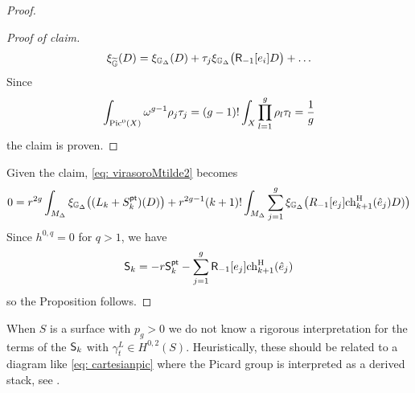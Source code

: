 \documentclass[a4paper, 12pt]{amsart}
\begin{document}
\begin{proof}
\begin{proof}[Proof of claim]
\begin{align*}
\xi_{\widetilde {{\mathbb{G}}}}(D)=\xi_{{\mathbb{G}}_\Delta}(D)+\tau_j\xi_{{\mathbb{G}}_\Delta}\big(\mathsf{R}_{-1}[e_i]D\big)+\ldots
\end{align*}
Since 
\[\int_{\mathop{\rm Pic}\nolimits^0(X)}\omega^{g-1}\rho_j\tau_j=(g-1)!\int_X \prod_{l=1}^g \rho_l\tau_l=\frac{1}{g}\]
the claim is proven.\qedhere
\end{proof}
Given the claim, \eqref{eq: virasoroMtilde2} becomes
\[
0=r^{2g}\int_{M_\Delta}\xi_{{\mathbb{G}}_\Delta}\big((L_k+S_k^{\mathsf{pt}})(D)\big)+r^{2g-1}(k+1)!\int_{M_\Delta}\sum_{j=1}^g\xi_{{\mathbb{G}}_\Delta}\big(R_{-1}[e_j]\mathrm{ch}^{\mathrm{H}}_{k+1}(\hat e_j) D)\big)
\]
Since $h^{0, q}=0$ for $q>1$, we have
\[{\mathsf{S}}_k=-r{\mathsf{S}}_k^{\mathsf{pt}}-\sum_{j=1}^g \mathsf{R}_{-1}[e_j]\mathrm{ch}^{\mathrm{H}}_{k+1}(\hat e_j) \]
so the Proposition follows. \qedhere
\end{proof}
\begin{remark}\label{rem: fixed det}
When $S$ is a surface with $p_g>0$ we do not know a rigorous interpretation for the terms of the ${\mathsf{S}}_k$ with $\gamma_t^L\in H^{0,2}(S)$. Heuristically, these should be related to a diagram like \eqref{eq: cartesianpic} where the Picard group is interpreted as a derived stack, see \cite{STV}. 
\end{remark}
\end{document}
